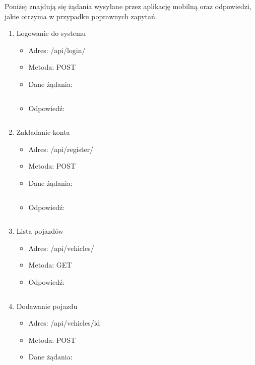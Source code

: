 Poniżej znajdują się żądania wysyłane przez aplikację mobilną oraz odpowiedzi, jakie otrzyma w przypadku poprawnych zapytań.


\vspace{0.5cm}

\begin{enumerate}
	\item Logowanie do systemu
	\renewcommand{\labelitemi}{\textperiodcentered}
	\begin{itemize}
		\item Adres: /api/login/
		\item Metoda: POST
		\item Dane żądania:
		\inputminted[fontsize=\footnotesize]{json}{src/api/login.json}
		\item Odpowiedź:
		\inputminted[fontsize=\footnotesize]{json}{src/api/login-response.json}
	\end{itemize}
	\item Zakładanie konta
	\renewcommand{\labelitemi}{\textperiodcentered}
	\begin{itemize}
		\item Adres: /api/register/
		\item Metoda: POST
		\item Dane żądania:
		\inputminted[fontsize=\footnotesize]{json}{src/api/register.json}
		\item Odpowiedź:
		\inputminted[fontsize=\footnotesize]{json}{src/api/register-response.json}
	\end{itemize}
	\item Lista pojazdów
	\renewcommand{\labelitemi}{\textperiodcentered}
	\begin{itemize}
		\item Adres: /api/vehicles/
		\item Metoda: GET
		\item Odpowiedź:
		\inputminted[fontsize=\footnotesize]{json}{src/api/vehicles-response.json}
	\end{itemize}
	\item Dodawanie pojazdu
	\renewcommand{\labelitemi}{\textperiodcentered}
	\begin{itemize}
		\item Adres: /api/vehicles/{{id}}
		\item Metoda: POST
		\item Dane żądania:

\end{itemize}
\end{enumerate}
